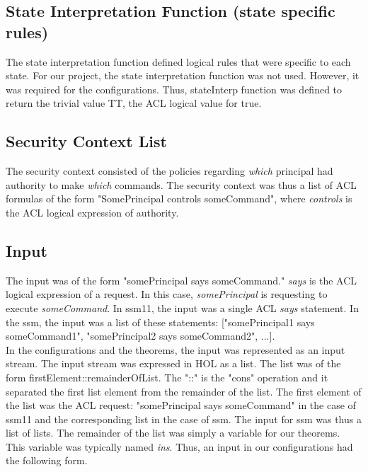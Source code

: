 \subsection{State Interpretation Function (state specific rules)}
\label{sec:state-interpr-funct}


  The state interpretation function defined logical rules that were specific to each state.
  For our project, the state interpretation function was not used.  However, it was required
  for the configurations.  Thus, stateInterp function was defined to return the trivial value
  TT, the ACL logical value for true.
  
\subsection{Security Context List}
\label{sec:secur-cont-list}

  The security context consisted of the policies regarding \textit{which} principal had authority
  to make \textit{which} commands. The security context was thus a list of ACL formulas of the form
  "SomePrincipal controls someCommand", where \textit{controls} is the ACL logical expression of authority.
  
\subsection{Input}
\label{sec:input}

   The input was of the form "somePrincipal says someCommand."  \textit{says} is the ACL
    logical expression of a request.   In this case, \textit{somePrincipal} is requesting to
    execute \textit{someCommand}.  In ssm11, the input was a single ACL \textit{says} statement.
    In the ssm, the input was a list of these statements:  ["somePrincipal1 says someCommand1",
    "somePrincipal2 says someCommand2", ...].\\
    
   In the configurations and the theorems, the input was represented as an input stream.
    The input stream was expressed in HOL as a list.  The list was of the form firstElement::remainderOfList.
    The "::" is the "cons" operation and it separated the first list element from the remainder of the
    list.  The first element of the list was the ACL request: "somePrincipal says someCommand" in the
    case of ssm11 and the corresponding list in the case of ssm.   The input for ssm was thus a list of
    lists.  The remainder of the list was simply a variable for our theorems.  This variable was typically
    named \textit{ins}.  Thus, an input in our configurations had the following form.\\
    

